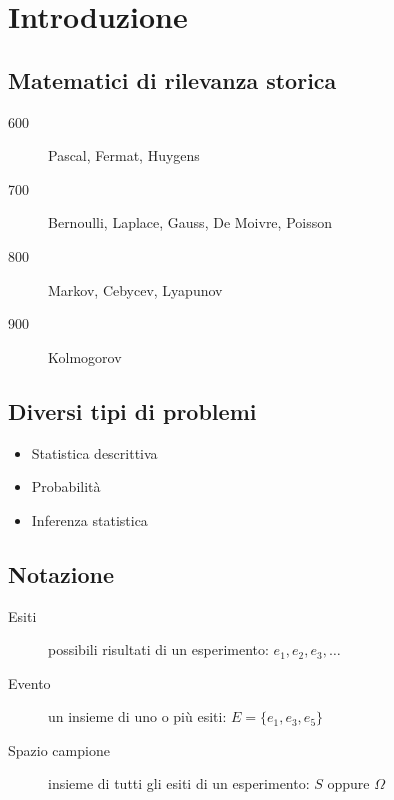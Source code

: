\documentclass{article}
\begin{document}
\section{Introduzione}

\subsection{Matematici di rilevanza storica}

\begin{description}
	\item[600] Pascal, Fermat, Huygens
	\item[700] Bernoulli, Laplace, Gauss, De Moivre, Poisson
	\item[800] Markov, Cebycev, Lyapunov
	\item[900] Kolmogorov
\end{description}

\subsection{Diversi tipi di problemi}

\begin{itemize}
    \item Statistica descrittiva
    \item Probabilità
    \item Inferenza statistica
\end{itemize}

\subsection{Notazione}

\begin{description}
	\item[Esiti] possibili risultati di un esperimento: $e_1, e_2, e_3, \dots$
	\item[Evento] un insieme di uno o più esiti: $E = \{ e_1, e_3, e_5 \}$
	\item[Spazio campione] insieme di tutti gli esiti di un esperimento: $S \text{ oppure } \Omega$
\end{description}
\end{document}
